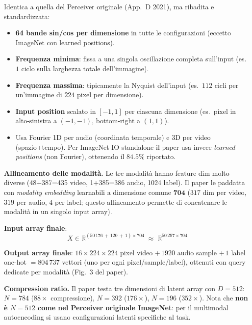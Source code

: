 \documentclass[
  11pt,
]{article}
\begin{document}
\begin{notabox}[title={\textbf{Convenzione Fourier features del paper IO (App.\ G)}}]
Identica a quella del Perceiver originale (App.\ D 2021), ma ribadita e standardizzata:
\begin{itemize}\setlength\itemsep{0.1em}
\item \textbf{64 bande sin/cos per dimensione} in tutte le configurazioni (eccetto ImageNet con learned positions).
\item \textbf{Frequenza minima}: fissa a una singola oscillazione completa sull'input (es.\ $1$ ciclo sulla larghezza totale dell'immagine).
\item \textbf{Frequenza massima}: tipicamente la Nyquist dell'input (es.\ $112$ cicli per un'immagine di $224$ pixel per dimensione).
\item \textbf{Input position} scalato in $[-1, 1]$ per ciascuna dimensione (es.\ pixel in alto-sinistra a $(-1,-1)$, bottom-right a $(1,1)$).
\item Usa Fourier 1D per audio (coordinata temporale) e 3D per video (spazio+tempo). Per ImageNet IO standalone il paper usa invece \emph{learned positions} (non Fourier), ottenendo il $84.5\%$ riportato.
\end{itemize}
\end{notabox}

\textbf{Allineamento delle modalità.} Le tre modalità hanno feature dim molto diverse (48+387=435 video, 1+385=386 audio, 1024 label). Il paper le paddatta con \emph{modality embedding} learnabili a dimensione comune $\mathbf{704}$ ($317$ dim per video, $319$ per audio, $4$ per label; questo allineamento permette di concatenare le modalità in un singolo input array).

\textbf{Input array finale}:
\[
X \in \mathbb{R}^{(50\,176\, +\, 120\, +\, 1) \times 704} \;\approx\; \mathbb{R}^{50\,297 \times 704}
\]

\textbf{Output array finale}: $16 \times 224 \times 224$ pixel video $+\, 1920$ audio sample $+\, 1$ label one-hot $= 804\,737$ vettori (uno per ogni pixel/sample/label), ottenuti con query dedicate per modalità (Fig.\ 3 del paper).

\textbf{Compression ratio.} Il paper testa tre dimensioni di latent array con $D = 512$: $N = 784$ ($88\times$ compressione), $N = 392$ ($176\times$), $N = 196$ ($352\times$). Nota che \textbf{non è $N=512$ come nel Perceiver originale ImageNet}: per il multimodal autoencoding si usano configurazioni latenti specifiche al task.
\end{document}
